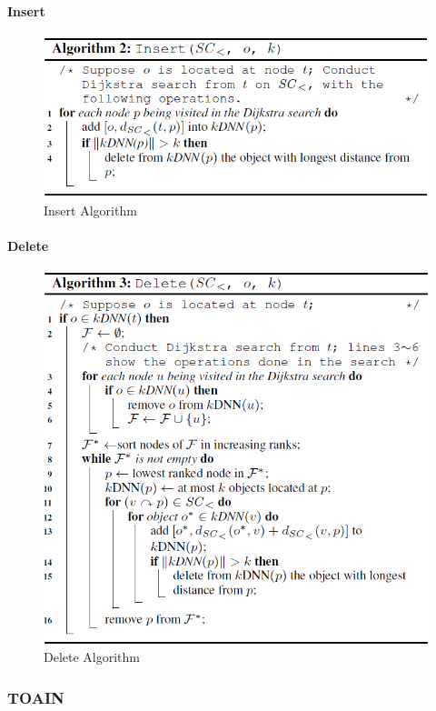 \documentclass{ML}
\begin{document}
\paragraph{Insert}
\begin{figure}[htb]
	\centering
	\includegraphics[width=0.8\linewidth]{media/insert.png}
	\caption{Insert Algorithm}\label{fig:insert}
\end{figure}
\paragraph{Delete}
\begin{figure}[htb]
	\centering
	\includegraphics[width=0.8\linewidth]{media/delete.png}
	\caption{Delete Algorithm}\label{fig:delete}
\end{figure}
\subsubsection{TOAIN}
\end{document}
